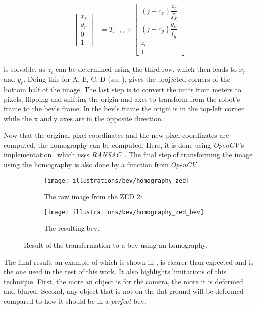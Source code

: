 \begin{align}
    \label{eq:homography:complete}
    \begin{bmatrix}
        x_r \\
        y_r \\
        0   \\
        1
    \end{bmatrix} &= T_{c\rightarrow r} \times
    \begin{bmatrix}
    (j - c_x)
        \dfrac{z_c}{f_x}\\
        (j - c_y) \dfrac{y_c}{f_y} \\
        z_c                        \\
        1
    \end{bmatrix}
\end{align}

 is solvable, as $z_c$ can be determined using the third row, which then leads to $x_r$ and $y_r$.
Doing this for A, B, C, D (see ), gives the projected corners of the bottom half of the image.
The last step is to convert the units from meters to pixels, flipping and shifting the origin and axes to transform from the robot's frame
to the \gls{bev}'s frame.
In the \gls{bev}'s frame the origin is in the top-left corner while the x and y axes are in the opposite direction.


Now that the original pixel coordinates and the new pixel coordinates are computed, the homography can be computed.
Here, it is done using \textit{OpenCV}'s implementation~\cite{bradski_opencv_nodate} which uses \textit{RANSAC}~\cite{fischler_random_1981}.
The final step of transforming the image using the homography is also done by a function from \textit{OpenCV}~\cite{bradski_opencv_nodate}.


\begin{figure}[ht!]
    \begin{subfigure}[t]{0.35\textwidth}
        \texttt{[image: illustrations/bev/homography\_zed]}
        \caption{The raw image from the ZED 2i.}
        \label{fig:homography:zed}
    \end{subfigure}
    \hfill
    \begin{subfigure}[t]{0.58\textwidth}
        \texttt{[image: illustrations/bev/homography\_zed\_bev]}
        \caption{The resulting \gls{bev}.}
        \label{fig:homography:zed_bev}
    \end{subfigure}
    \hfill
    \caption{Result of the transformation to a \gls{bev} using an homography.}
    \label{fig:homography:example}
\end{figure}

The final result, an example of which is shown in , is clearer than expected and is the one used in the rest of this work.
It also highlights limitations of this technique.
First, the more an object is for the camera, the more it is deformed and blured.
Second, any object that is not on the flat ground will be deformed compared to how it should be in a \textit{perfect} \gls{bev}.